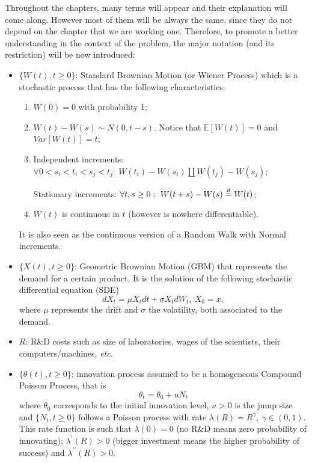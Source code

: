Throughout the chapters, many terms will appear and their explanation will come along. However most of them will be always the same, since they do not depend on the chapter that we are working one. Therefore, to promote a better understanding in the context of the problem, the major notation (and its restriction) will be now introduced:
\begin{itemize}
	\item $\{ W(t), t \geq 0 \}$: Standard Brownian Motion (or Wiener Process) which is a stochastic process that has the following characteristics:
	\begin{enumerate}
		\item $W(0) = 0$ with probability 1;
		\item $W(t) - W(s) \sim N(0, t-s)$. Notice that $\mathds{E}[W(t)] = 0$ and $Var[W(t)] = t$;
		\item Independent increments: $\forall 0 < s_i < t_i < s_j < t_j: \ W(t_i) - W(s_i) \amalg W(t_j) - W(s_j) $;
		
		Stationary increments:  $\forall t,s \geq 0: \ W(t+s) - W(s) \buildrel d\over= W(t) $;
		\item $W(t)$ is continuous in $t$ (however is nowhere differentiable).
	\end{enumerate}
It is also seen as the continuous version of a Random Walk with Normal increments.

	\item  $\{ X(t), t \geq 0 \}$: Geometric Brownian Motion (GBM) that represents the demand for a certain product. It is the solution of the following stochastic differential equation (SDE)
	$$ dX_t=\mu X_t dt + \sigma X_t d W_t, \ X_0=x, $$
	where $\mu$ represents the drift and $\sigma$ the volatility, both associated to the demand.
	
	\item $R$: R\&D costs such as size of laboratories, wages of the scientists, their computers/machines, \textit{etc}.
	
	\item  $\{ \theta(t), t \geq 0 \}$: innovation process assumed to be a homogeneous Compound Poisson Process, that is 
	$$\theta_t= \theta_0+ u N_t$$
	where $\theta_0$ corresponds to the initial innovation level, $u > 0$ is the jump size and $\{N_t, t \geq 0\}$ follows a Poisson process with rate $\lambda(R)=R^\gamma, \ \gamma \in (0,1)$. This rate function is such that $\lambda(0) = 0$ (no R\&D means zero probability of innovating); $\lambda^\prime (R)>0$ (bigger investment means the higher probability of success) and $ \lambda ^{ \prime \prime} (R)>0$.
	

\end{itemize}
